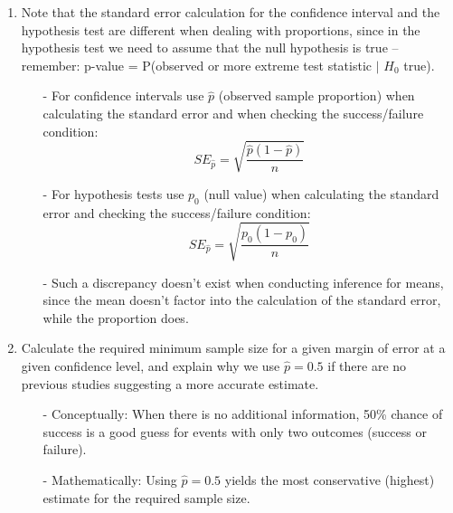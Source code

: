 \documentclass[11pt]{article}
\begin{document}
\begin{enumerate}
\item Note that the standard error calculation for the confidence interval and the hypothesis test are different when dealing with proportions, since in the hypothesis test we need to assume that the null hypothesis is true -- remember: p-value = P(observed or more extreme test statistic $|$ $H_0$ true).
\begin{itemize}
\item[-] For confidence intervals use $\hat{p}$ (observed sample proportion) when calculating the standard error and when checking the success/failure condition:
\[ SE_{\hat{p}} = \sqrt{\frac{\hat{p}(1-\hat{p})}{n}} \]
\item[-] For hypothesis tests use $p_0$ (null value) when calculating the standard error and checking the success/failure condition:
\[ SE_{\hat{p}} = \sqrt{\frac{p_0 (1-p_0)}{n}} \]
\item[-] Such a discrepancy doesn't exist when conducting inference for means, since the mean doesn't factor into the calculation of the standard error, while the proportion does.
\end{itemize}

\item Calculate the required minimum sample size for a given margin of error at a given confidence level, and explain why we use $\hat{p} = 0.5$ if there are no previous studies suggesting a more accurate estimate.
\begin{itemize}
\item[-] Conceptually: When there is no additional information, 50\% chance of success is a good guess for events with only two outcomes (success or failure).
\item[-] Mathematically: Using $\hat{p} = 0.5$ yields the most conservative (highest) estimate for the required sample size.
\end{itemize}

\end{enumerate}
\end{document}
